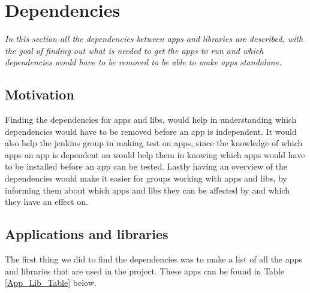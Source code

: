 \section{Dependencies}
\label{Dependencies}
\textit{In this section all the dependencies between apps and libraries are described, with the goal of finding out what is needed to get the apps to run and which dependencies would have to be removed to be able to make apps standalone.}


\subsection{Motivation}
Finding the dependencies for apps and libs, would help in understanding which dependencies would have to be removed before an app is independent. It would also help the jenkins group in making test on apps, since the knowledge of which apps an app is dependent on would help them in knowing which apps would have to be installed before an app can be tested. Lastly having an overview of the dependencies would make it easier for groups working with apps and libs, by informing them about which apps and libs they can be affected by and which they have an effect on.


\subsection{Applications and libraries}
The first thing we did to find the dependencies was to make a list of all the apps and libraries that are used in the project. These apps can be found in Table \ref{App_Lib_Table} below.

